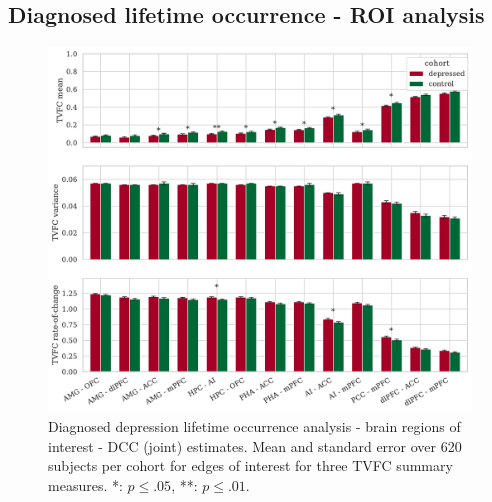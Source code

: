 \clearpage
\subsection{Diagnosed lifetime occurrence - ROI analysis}


\begin{figure}[h]
  \centering
  \includegraphics[width=\textwidth]{fig/ukbiobank/TVFC_predictions_summaries/diagnosed_lifetime_occurrence/cohort_comparison/ROI/correlation_all_TVFC_summary_measures_DCC_joint_edges_of_interest}
  \caption{
    Diagnosed depression lifetime occurrence analysis - brain regions of interest - DCC (joint) estimates.
    Mean and standard error over 620 subjects per cohort for edges of interest for three TVFC summary measures.
    *: $p \leq .05$, **: $p \leq .01$.
  }\label{fig:ukb-results-dlo-roi-cohort-comparison-edges-of-interest-dcc-j}
\end{figure}


